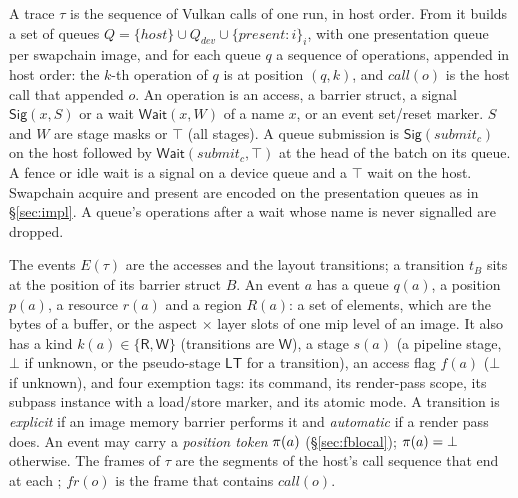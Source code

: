 \begin{definition}\label{def:events}
A trace $\tau$ is the sequence of Vulkan calls of one run, in host order. From it \sys builds a set of queues
$Q = \{\mathit{host}\} \cup Q_{\mathit{dev}} \cup \{\mathit{present}{:}i\}_i$, with one presentation queue per
swapchain image, and for each queue $q$ a sequence of operations, appended in host order: the $k$-th operation of $q$
is at position $(q,k)$, and $\mathit{call}(o)$ is the host call that appended $o$. An operation is an access, a
barrier struct, a signal $\mathsf{Sig}(x,S)$ or a wait $\mathsf{Wait}(x,W)$ of a name $x$, or an event set/reset
marker. $S$ and $W$ are stage masks or $\top$ (all stages). A queue submission is $\mathsf{Sig}(\mathit{submit}_c)$ on
the host followed by $\mathsf{Wait}(\mathit{submit}_c,\top)$ at the head of the batch on its queue. A fence or idle
wait is a signal on a device queue and a $\top$ wait on the host. Swapchain acquire and present are encoded on the
presentation queues as in \S\ref{sec:impl}. A queue's operations after a wait whose name is never signalled are
dropped.

The events $E(\tau)$ are the accesses and the layout transitions; a transition $t_B$ sits at the position of its
barrier struct $B$. An event $a$ has a queue $q(a)$, a position $p(a)$, a resource $r(a)$ and a region
$R(a)$: a set of elements, which are the bytes of a buffer, or the aspect $\times$ layer slots of one mip level of an
image. It also has a kind $k(a) \in \{\mathsf{R},\mathsf{W}\}$ (transitions are $\mathsf{W}$), a stage $s(a)$ (a
pipeline stage, $\bot$ if unknown, or the pseudo-stage $\mathsf{LT}$ for a transition), an access flag $f(a)$ ($\bot$ if
unknown), and four exemption tags: its command, its render-pass scope, its subpass instance with a load/store
marker, and its atomic mode. A transition is \emph{explicit} if an image memory barrier performs it and
\emph{automatic} if a render pass does. An event may carry a \emph{position token} $\pi(a)$
(\S\ref{sec:fblocal}); $\pi(a) = \bot$ otherwise. The frames of $\tau$ are the segments of the host's call sequence that end at each
; $\mathit{fr}(o)$ is the frame that contains $\mathit{call}(o)$.
\end{definition}

